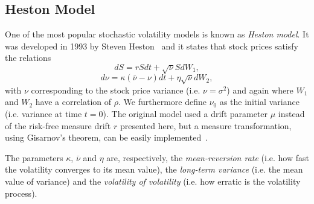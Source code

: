 \subsection{Heston Model}
One of the most popular stochastic volatility models is known as \emph{Heston model}. It was developed in 1993 by Steven Heston~\cite{Heston} and it states that stock prices satisfy the relations
\begin{equation}\label{hestons}
\boxed{dS=rSdt+\sqrt{\nu}SdW_1,}
\end{equation}
\begin{equation}\label{hestonv}
\boxed{d\nu=\kappa(\overline{\nu}-\nu)dt+\eta\sqrt{\nu}dW_2,}
\end{equation}
\noindent with $\nu$ corresponding to the stock price variance (i.e. $\nu=\sigma^2$) and again where $W_1$ and $W_2$ have a correlation of $\rho$. We furthermore define $\nu_0$ as the initial variance (i.e. variance at time $t=0$). The original model used a drift parameter $\mu$ instead of the risk-free measure drift $r$ presented here, but a measure transformation, using Gisarnov's theorem, can be easily implemented~\cite{rouah}.

The parameters $\kappa$, $\overline{\nu}$ and $\eta$ are, respectively, the \emph{mean-reversion rate} (i.e. how fast the volatility converges to its mean value), the \emph{long-term variance} (i.e. the mean value of variance) and the \emph{volatility of volatility} (i.e. how erratic is the volatility process).



